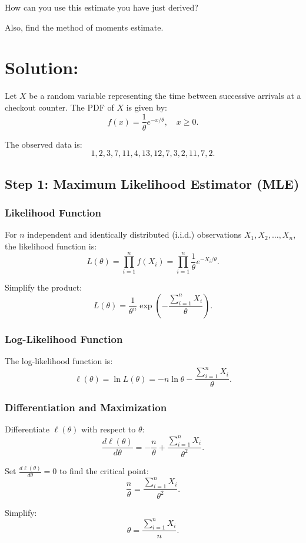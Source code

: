 \documentclass{article}
\begin{document}
How can you use this estimate you have just derived?

Also, find the method of moments estimate.


\section*{Solution:}

Let $X$ be a random variable representing the time between successive arrivals at a checkout counter. The PDF of $X$ is given by:
\[
f(x) = \frac{1}{\theta} e^{-x / \theta}, \quad x \geq 0.
\]

The observed data is:
\[
1, 2, 3, 7, 11, 4, 13, 12, 7, 3, 2, 11, 7, 2.
\]

\subsection*{Step 1: Maximum Likelihood Estimator (MLE)}

\subsubsection*{Likelihood Function}
For $n$ independent and identically distributed (i.i.d.) observations $X_1, X_2, \dots, X_n$, the likelihood function is:
\[
L(\theta) = \prod_{i=1}^n f(X_i) = \prod_{i=1}^n \frac{1}{\theta} e^{-X_i / \theta}.
\]

Simplify the product:
\[
L(\theta) = \frac{1}{\theta^n} \exp\left(-\frac{\sum_{i=1}^n X_i}{\theta}\right).
\]

\subsubsection*{Log-Likelihood Function}
The log-likelihood function is:
\[
\ell(\theta) = \ln L(\theta) = -n \ln \theta - \frac{\sum_{i=1}^n X_i}{\theta}.
\]

\subsubsection*{Differentiation and Maximization}
Differentiate $\ell(\theta)$ with respect to $\theta$:
\[
\frac{d\ell(\theta)}{d\theta} = -\frac{n}{\theta} + \frac{\sum_{i=1}^n X_i}{\theta^2}.
\]

Set $\frac{d\ell(\theta)}{d\theta} = 0$ to find the critical point:
\[
\frac{n}{\theta} = \frac{\sum_{i=1}^n X_i}{\theta^2}.
\]

Simplify:
\[
\theta = \frac{\sum_{i=1}^n X_i}{n}.
\]
\end{document}
